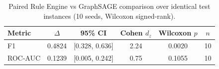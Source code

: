 \begin{table}[t]
\centering
\small
\caption{Paired Rule Engine vs GraphSAGE comparison over identical test instances (10 seeds, Wilcoxon signed-rank).}
\label{tab:significance}
\setlength{\tabcolsep}{4pt}
\begin{tabular}{lccccc}
\toprule
Metric & $\Delta$ & 95\% CI & Cohen $d_z$ & Wilcoxon $p$ & $n$ \\
\midrule
F1 & 0.4824 & [0.328, 0.636] & 2.24 & 0.0020 & 10 \\
ROC-AUC & 0.1239 & [0.005, 0.242] & 0.75 & 0.1055 & 10 \\
\bottomrule
\end{tabular}
\end{table}
